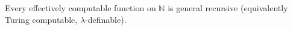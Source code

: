 Every effectively computable function on $\mathbb{N}$ is general recursive (equivalently Turing computable, $\lambda$-definable).
